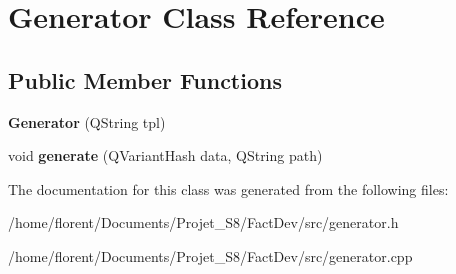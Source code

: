\hypertarget{classGenerator}{\section{Generator Class Reference}
\label{classGenerator}
}
\subsection*{Public Member Functions}
\begin{DoxyCompactItemize}
\item 
\hypertarget{classGenerator_a1fa8cef2649c6ef99eab0ea320d1a855}{{\bfseries Generator} (Q\-String tpl)}\label{classGenerator_a1fa8cef2649c6ef99eab0ea320d1a855}

\item 
\hypertarget{classGenerator_a37ebd7de69a0535bdb7fdb6f4eda4cb5}{void {\bfseries generate} (Q\-Variant\-Hash data, Q\-String path)}\label{classGenerator_a37ebd7de69a0535bdb7fdb6f4eda4cb5}

\end{DoxyCompactItemize}


The documentation for this class was generated from the following files\-:\begin{DoxyCompactItemize}
\item 
/home/florent/\-Documents/\-Projet\-\_\-\-S8/\-Fact\-Dev/src/generator.\-h\item 
/home/florent/\-Documents/\-Projet\-\_\-\-S8/\-Fact\-Dev/src/generator.\-cpp\end{DoxyCompactItemize}
